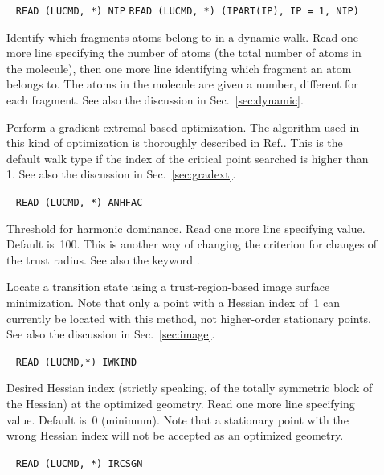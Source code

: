 \begin{description}
\item[]\verb| |\newline
\verb|READ (LUCMD, *) NIP|\newline
\verb|READ (LUCMD, *) (IPART(IP), IP = 1, NIP)|

Identify which fragments atoms belong to in
a dynamic walk.  Read one more line specifying the number of
atoms (the total number of atoms in the molecule), then one more
line identifying which fragment an atom belongs to. The atoms in the
molecule are given a number, different for each fragment. See also the
discussion in Sec.~\ref{sec:dynamic}.

\item[] Perform a gradient extremal-based optimization. The algorithm used in this kind of optimization is
thoroughly described in Ref.\cite{pjhjajthtca73}. This is the default walk
type if the  index of the critical point searched is higher than
1. See also the discussion in Sec.~\ref{sec:gradext}.

\item[]\verb| |\newline
\verb|READ (LUCMD, *) ANHFAC|

Threshold for harmonic dominance.  Read one
more line specifying value. Default is~100. This is  another
way of changing the criterion for changes of the trust
radius. See also the keyword .

\item[] Locate a transition state using a
trust-region-based image surface minimization.
Note that only a
point with a Hessian index of~1 can currently be located with this
method, not higher-order stationary points. See also the discussion in
Sec.~\ref{sec:image}.

\item[]\verb| |\newline
\verb|READ (LUCMD,*) IWKIND|

Desired Hessian index (strictly speaking, of the
totally symmetric block of the Hessian) at the optimized geometry.
Read one more line specifying value.  Default is~0 (minimum).
Note that a stationary point with the wrong Hessian index will not
be accepted as an optimized geometry.

\item[]\verb| |\newline
\verb|READ (LUCMD, *) IRCSGN|


\end{description}
